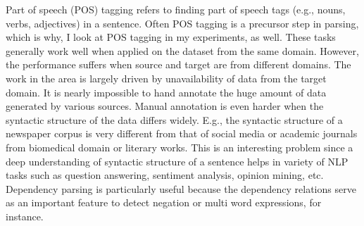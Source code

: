 Part of speech (POS) tagging refers to finding part of speech tags (e.g., nouns, verbs, adjectives) in a sentence. Often POS tagging is a precursor step in parsing, which is why, I look at POS tagging in my experiments, as well. These tasks generally work well when applied on the dataset from the same domain. However, the performance suffers when source and target are from different domains. The work in the area is largely driven by unavailability of data from the target domain. It is nearly impossible to hand annotate the huge amount of data generated by various sources. Manual annotation is even harder when the syntactic structure of the data differs widely. E.g., the syntactic structure of a newspaper corpus is very different from that of social media or academic journals from biomedical domain or literary works. This is an interesting problem since a deep understanding of syntactic structure of a sentence helps in variety of NLP tasks such as question answering, sentiment analysis, opinion mining, etc. Dependency parsing is particularly useful because the dependency relations serve as an important feature to detect negation or multi word expressions, for instance. 
